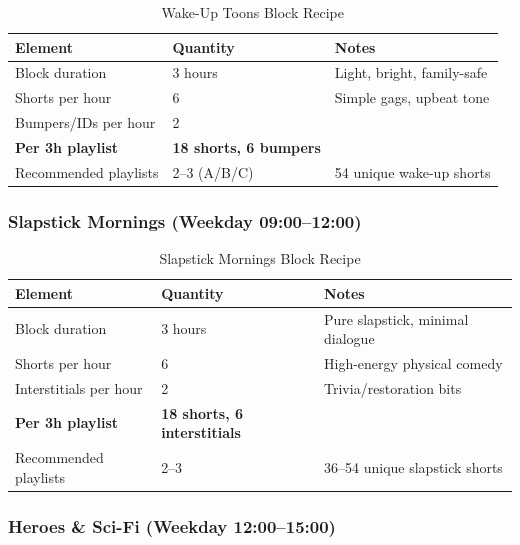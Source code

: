\documentclass[12pt,letterpaper,twoside]{report}
\begin{document}
\begin{table}[H]
\centering
\caption{Wake-Up Toons Block Recipe}
\begin{tabular}{@{}L{4cm}L{3cm}L{6cm}@{}}
\toprule
\textbf{Element} & \textbf{Quantity} & \textbf{Notes} \\
\midrule
Block duration & 3 hours & Light, bright, family-safe \\
Shorts per hour & 6 & Simple gags, upbeat tone \\
Bumpers/IDs per hour & 2 & \\
\midrule
\textbf{Per 3h playlist} & \textbf{18 shorts, 6 bumpers} & \\
\midrule
Recommended playlists & 2--3 (A/B/C) & 54 unique wake-up shorts \\
\bottomrule
\end{tabular}
\end{table}

\subsubsection{Slapstick Mornings (Weekday 09:00--12:00)}

\begin{table}[H]
\centering
\caption{Slapstick Mornings Block Recipe}
\begin{tabular}{@{}L{4cm}L{3cm}L{6cm}@{}}
\toprule
\textbf{Element} & \textbf{Quantity} & \textbf{Notes} \\
\midrule
Block duration & 3 hours & Pure slapstick, minimal dialogue \\
Shorts per hour & 6 & High-energy physical comedy \\
Interstitials per hour & 2 & Trivia/restoration bits \\
\midrule
\textbf{Per 3h playlist} & \textbf{18 shorts, 6 interstitials} & \\
\midrule
Recommended playlists & 2--3 & 36--54 unique slapstick shorts \\
\bottomrule
\end{tabular}
\end{table}

\subsubsection{Heroes \& Sci-Fi (Weekday 12:00--15:00)}
\end{document}
